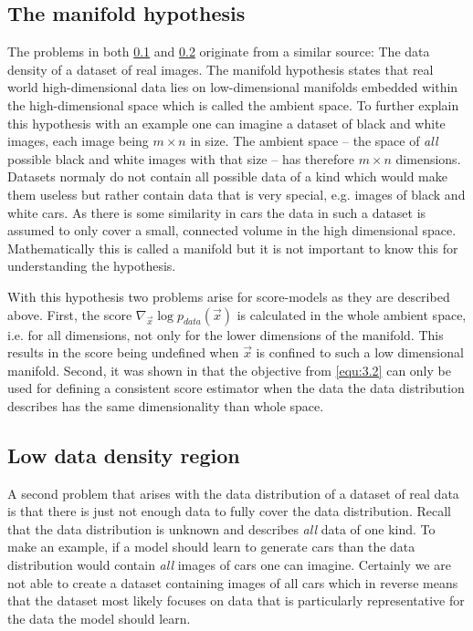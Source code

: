 \subsection{The manifold hypothesis} \label{sec:3.2.1}
The problems in both \cref{sec:3.2.1} and \cref{sec:3.2.2} originate from a similar source: The data density of a dataset of real images. The manifold hypothesis states that real world high-dimensional data lies on low-dimensional manifolds embedded within the high-dimensional space which is called the ambient space. To further explain this hypothesis with an example one can imagine a dataset of black and white images, each image being $m\times n$ in size. The ambient space – the space of \textit{all} possible black and white images with that size – has therefore $m\times n$ dimensions. Datasets normaly do not contain all possible data of a kind which would make them useless but rather contain data that is very special, e.g. images of black and white cars. As there is some similarity in cars the data in such a dataset is assumed to only cover a small, connected volume in the high dimensional space. Mathematically this is called a manifold but it is not important to know this for understanding the hypothesis.

With this hypothesis two problems arise for score-models as they are described above. First, the score $\nabla_{\vec{x}}\log p_{data}(\vec{x})$ is calculated in the whole ambient space, i.e. for all dimensions, not only for the lower dimensions of the manifold. This results in the score being undefined when $\vec{x}$ is confined to such a low dimensional manifold. Second, it was shown in \cite{score_matching_original} that the objective from \cref{equ:3.2} can only be used for defining a consistent score estimator when the data the data distribution describes has the same dimensionality than whole space.
%
\subsection{Low data density region}\label{sec:3.2.2}
A second problem that arises with the data distribution of a dataset of real data is that there is just not enough data to fully cover the data distribution. Recall that the data distribution is unknown and describes \textit{all} data of one kind. To make an example, if a model should learn to generate cars than the data distribution would contain \textit{all} images of cars one can imagine. Certainly we are not able to create a dataset containing images of all cars which in reverse means that the dataset most likely focuses on data that is particularly representative for the data the model should learn.

